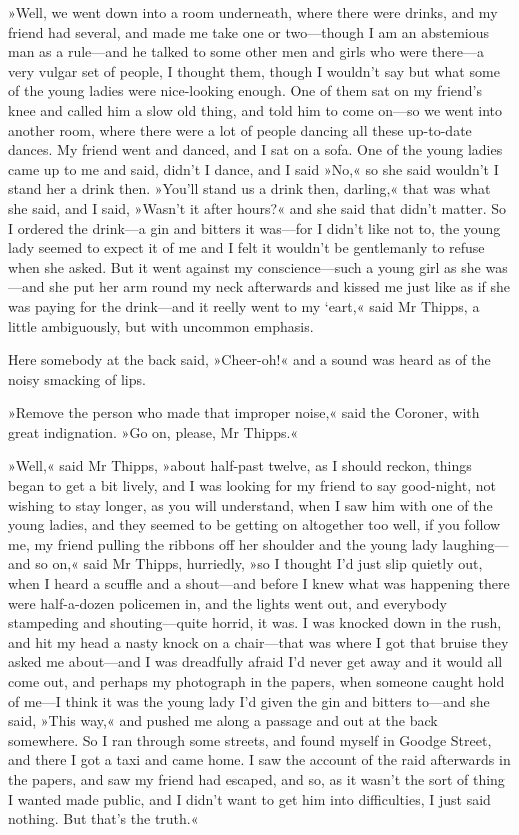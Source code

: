 »Well, we went down into a room underneath, where there were drinks, and my friend had several, and made me take one or two—though I am an abstemious man as a rule—and he talked to some other men and girls who were there—a very vulgar set of people, I thought them, though I wouldn't say but what some of the young ladies were nice-looking enough. One of them sat on my friend's knee and called him a slow old thing, and told him to come on—so we went into another room, where there were a lot of people dancing all these up-to-date dances. My friend went and danced, and I sat on a sofa. One of the young ladies came up to me and said, didn't I dance, and I said »No,« so she said wouldn't I stand her a drink then. »You'll stand us a drink then, darling,« that was what she said, and I said, »Wasn't it after hours?« and she said that didn't matter. So I ordered the drink—a gin and bitters it was—for I didn't like not to, the young lady seemed to expect it of me and I felt it wouldn't be gentlemanly to refuse when she asked. But it went against my conscience—such a young girl as she was—and she put her arm round my neck afterwards and kissed me just like as if she was paying for the drink—and it reelly went to my `eart,« said Mr Thipps, a little ambiguously, but with uncommon emphasis.

Here somebody at the back said, »Cheer-oh!« and a sound was heard as of the noisy smacking of lips.

»Remove the person who made that improper noise,« said the Coroner, with great indignation. »Go on, please, Mr Thipps.«

»Well,« said Mr Thipps, »about half-past twelve, as I should reckon, things began to get a bit lively, and I was looking for my friend to say good-night, not wishing to stay longer, as you will understand, when I saw him with one of the young ladies, and they seemed to be getting on altogether too well, if you follow me, my friend pulling the ribbons off her shoulder and the young lady laughing—and so on,« said Mr Thipps, hurriedly, »so I thought I'd just slip quietly out, when I heard a scuffle and a shout—and before I knew what was happening there were half-a-dozen policemen in, and the lights went out, and everybody stampeding and shouting—quite horrid, it was. I was knocked down in the rush, and hit my head a nasty knock on a chair—that was where I got that bruise they asked me about—and I was dreadfully afraid I'd never get away and it would all come out, and perhaps my photograph in the papers, when someone caught hold of me—I think it was the young lady I'd given the gin and bitters to—and she said, »This way,« and pushed me along a passage and out at the back somewhere. So I ran through some streets, and found myself in Goodge Street, and there I got a taxi and came home. I saw the account of the raid afterwards in the papers, and saw my friend had escaped, and so, as it wasn't the sort of thing I wanted made public, and I didn't want to get him into difficulties, I just said nothing. But that's the truth.«

